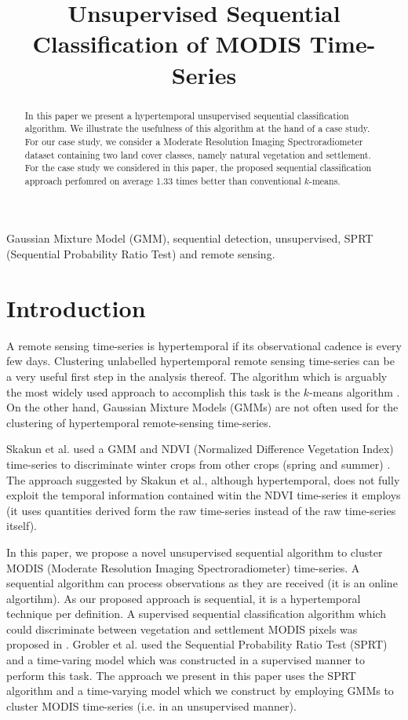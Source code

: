 \documentclass{article}
\title{Unsupervised Sequential Classification of MODIS Time-Series}
\begin{document}
%
\maketitle
%
\begin{abstract}
In this paper we present a hypertemporal unsupervised sequential classification algorithm.  
We illustrate the usefulness of this algorithm at the hand of a case study. For our case study, we consider a Moderate Resolution Imaging Spectroradiometer dataset containing two land cover classes, namely natural vegetation and settlement. For the 
case study we considered in this paper, the proposed sequential classification approach perfomred on average 1.33 times better than conventional $k$-means.
\end{abstract}
%
\begin{keywords}
Gaussian Mixture Model (GMM), sequential detection, unsupervised, SPRT (Sequential Probability Ratio Test) and remote sensing.
\end{keywords}
%

\section{Introduction}
\label{sec:intro}
A remote sensing time-series is hypertemporal if its observational cadence is every few days. Clustering unlabelled hypertemporal remote sensing time-series can be a very useful first step in the analysis thereof. The algorithm which is arguably the most widely used approach to accomplish this task is the $k$-means algorithm \cite{viovy2000}. On the other hand, Gaussian Mixture Models (GMMs) are not often used for the clustering of hypertemporal remote-sensing time-series.

Skakun et al. used a GMM and NDVI (Normalized Difference Vegetation Index) time-series to discriminate winter crops from other crops (spring and summer) \cite{skakun2017}. The approach suggested by Skakun et al., although hypertemporal, does not fully exploit the temporal information contained witin the NDVI time-series it employs (it uses quantities derived form the raw time-series instead of the raw time-series itself).

In this paper, we propose a novel unsupervised sequential algorithm to cluster MODIS (Moderate Resolution Imaging Spectroradiometer) time-series. A sequential algorithm can process observations as they are received (it is an online algortihm). As our proposed approach is sequential, it is a hypertemporal technique per definition.
A supervised sequential classification algorithm which could discriminate 
between vegetation and settlement MODIS pixels was proposed in \cite{ackermann2011t,grobler2012c}. Grobler et al. used the Sequential Probability Ratio Test (SPRT) and a time-varing model which was constructed in a supervised manner to perform this task. 
The approach we present in this paper uses the SPRT algorithm and a time-varying model which we construct by employing GMMs to cluster MODIS time-series (i.e. in an unsupervised manner).
\end{document}
